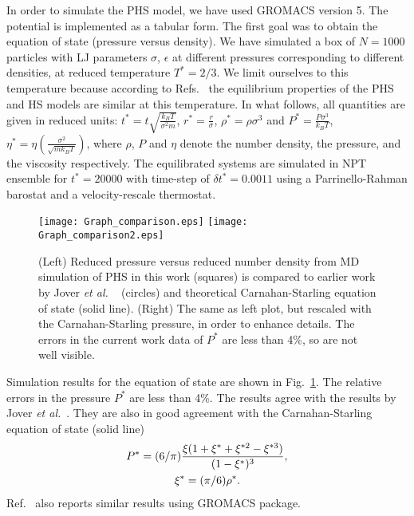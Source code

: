 \documentclass[preprint,pre,aps,superscriptaddress,a4paper]{revtex4}
\begin{document}
\label{sec3}
In order to simulate the PHS model, we have used GROMACS  version 5. The  potential is implemented as a  tabular form. The first goal was to obtain the equation of state (pressure versus density). We have simulated a box of  $N=1000$  particles  with  LJ parameters  $\sigma$, $\epsilon$ at different pressures  corresponding to different densities, at reduced temperature   $ T^*=2/3$. We limit ourselves to this  temperature because according to Refs.~\cite{vega:13:0,jover:12:0} the equilibrium properties of the PHS and HS models are similar at this temperature. In what follows, all quantities are given in reduced units: $t^*=t\sqrt{ \frac{k_B T}{\sigma^2 m}}$, $r^*= \frac{r}{\sigma}$, $\rho^*= \rho \sigma^3$ and $P^*=  \frac{P \sigma^3}{k_B T}$,  $\eta^*=\eta (\frac{\sigma ^2 }{\sqrt {mk_B T}})$, where $\rho$, $P$ and $\eta$ denote the number density, the pressure, and the viscosity respectively. 
 The equilibrated systems are simulated  in NPT ensemble for  $t^*=20000 $ with time-step of $\delta t^*=0.0011$ using a Parrinello-Rahman barostat and a velocity-rescale thermostat. 


\begin{figure}
\centering
\hspace{-0cm}
\texttt{[image: Graph\_comparison.eps]}
\texttt{[image: Graph\_comparison2.eps]}
\caption{(Left) Reduced pressure versus reduced number density from MD simulation of PHS in this work (squares) is compared to earlier work by Jover {\it {et al.}} ~\cite{jover:12:0} (circles) and theoretical Carnahan-Starling equation of state (solid line).{  (Right) The same as left plot, but rescaled with the Carnahan-Starling pressure, in order to enhance details. } The errors in  the current work data of $P^*$ are less than 4\%, so are not well visible.
}
\label{PHS}
\end{figure}

 Simulation results for the equation of state are  shown in Fig.~\ref{PHS}.  The relative errors in the pressure  $P^*$  are less than 4\%. The results agree with the results by Jover {\it {et al.}}~\cite{jover:12:0}. 
They are also in good agreement with the Carnahan-Starling equation of state (solid line) \cite{Carnahan:69:00} 
\begin{align} 
P^*= (6/\pi)\frac{\xi(1+\xi^*+\xi^{*2}-\xi^{*3})}{(1-\xi^*)^3}, \\
 \xi^*=(\pi/6) \rho^*.\hspace{1.5cm}
\end{align} 
Ref.~\cite{vega:13:0} also reports similar results using GROMACS package. 
\end{document}
